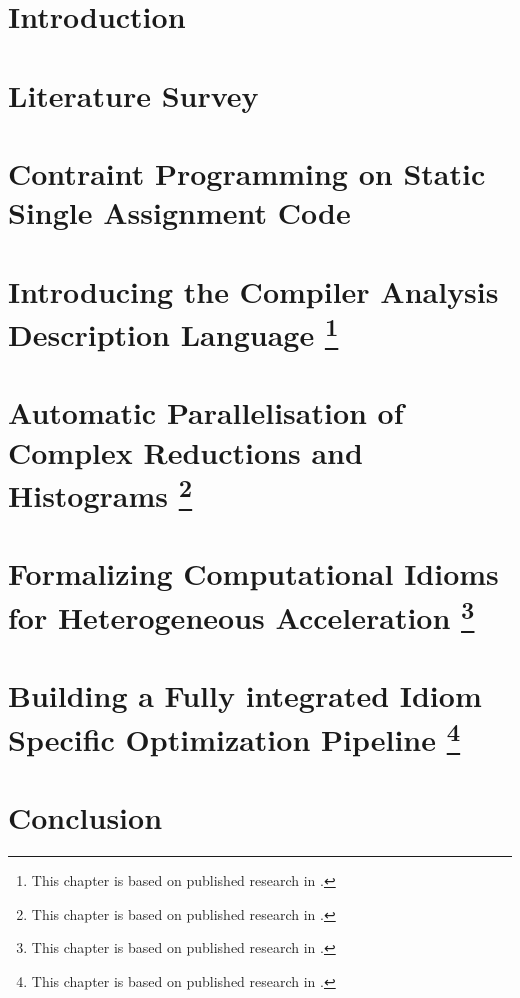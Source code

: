 \documentclass[phd,icsa,twoside,logo,11pt]{infthesis}
\begin{document}
\chapter{Introduction}
    \label{chapter:introduction}
    

\chapter{Literature Survey}
    \label{chapter:literature}
    

\chapter{Contraint Programming on Static Single Assignment Code}
    \label{chapter:theory}
    

\chapter[Introducing the Compiler Analysis Description Language]
        {Introducing the Compiler Analysis Description Language
         \footnote{This chapter is based on published research in
                  \citet{Ginsbach:2018:CDS:3178372.3179515}.}}
    \label{chapter:candl}
    

\chapter[Automatic Parallelisation of Complex Reductions and Histograms]
        {Automatic Parallelisation of Complex Reductions and Histograms
         \footnote{This chapter is based on published research in
                   \citet{ginsbach2017discovery}.}}
    \label{chapter:reductions}
    

\chapter[Formalizing Computational Idioms for Heterogeneous Acceleration]
        {Formalizing Computational Idioms for Heterogeneous Acceleration
         \footnote{This chapter is based on published research in
                   \citet{Ginsbach:2018:AML:3173162.3173182}.}}
    \label{chapter:idioms}
    

\chapter[Building a Fully integrated Idiom Specific Optimization Pipeline]
        {Building a Fully integrated Idiom Specific Optimization Pipeline
         \footnote{This chapter is based on published research in
                   \citet{}.}}
    \label{chapter:lilac}
    

\chapter{Conclusion}



\end{document}
